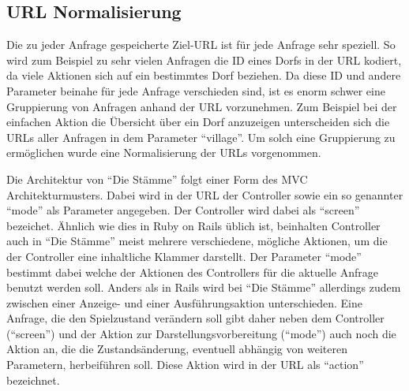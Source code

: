 \documentclass[10pt]{scrartcl}
\begin{document}


\subsection{URL Normalisierung}
\label{subsec:normalize_urls}
Die zu jeder Anfrage gespeicherte Ziel-URL ist für jede Anfrage sehr speziell. So wird zum Beispiel zu sehr vielen Anfragen die ID eines Dorfs in der URL kodiert, da viele Aktionen sich auf ein bestimmtes Dorf beziehen. Da diese ID und andere Parameter beinahe für jede Anfrage verschieden sind, ist es enorm schwer eine Gruppierung von Anfragen anhand der URL vorzunehmen. Zum Beispiel bei der einfachen Aktion die Übersicht über ein Dorf anzuzeigen unterscheiden sich die URLs aller Anfragen in dem Parameter ``village''. Um solch eine Gruppierung zu ermöglichen wurde eine Normalisierung der URLs vorgenommen.

Die Architektur von ``Die Stämme'' folgt einer Form des MVC Architekturmusters. Dabei wird in der URL der Controller sowie ein so genannter ``mode'' als Parameter angegeben. Der Controller wird dabei als ``screen'' bezeichet. Ähnlich wie dies in Ruby on Rails üblich ist, beinhalten Controller auch in ``Die Stämme'' meist mehrere verschiedene, mögliche Aktionen, um die der Controller eine inhaltliche Klammer darstellt. Der Parameter ``mode'' bestimmt dabei welche der Aktionen des Controllers für die aktuelle Anfrage benutzt werden soll. Anders als in Rails wird bei ``Die Stämme'' allerdings zudem zwischen einer Anzeige- und einer Ausführungsaktion unterschieden. Eine Anfrage, die den Spielzustand verändern soll gibt daher neben dem Controller (``screen'') und der Aktion zur Darstellungsvorbereitung (``mode'') auch noch die Aktion an, die die Zustandsänderung, eventuell abhängig von weiteren Parametern, herbeiführen soll. Diese Aktion wird in der URL als ``action'' bezeichnet.
\end{document}
